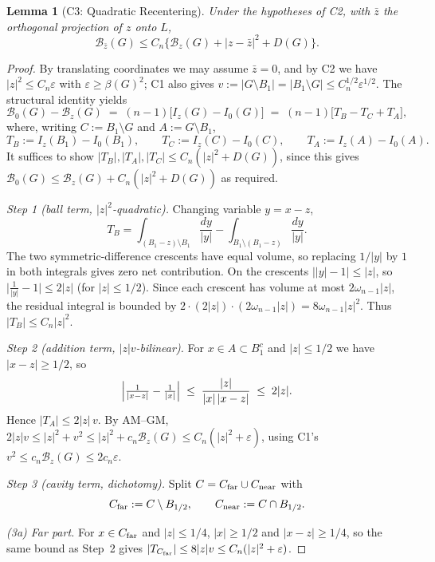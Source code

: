 \documentclass[11pt]{article}
\newtheorem{lemma}[theorem]{Lemma}
\newcommand{\B}{\mathcal{B}}
\newcommand{\eps}{\varepsilon}
\begin{document}
\begin{lemma}[C3: Quadratic Recentering] \label{lem:C3}
Under the hypotheses of C2, with $\bar z$ the orthogonal projection of $z$ onto $L$,
\[
  \B_{\bar z}(G) \le C_n \{ \B_z(G) + |z - \bar z|^2 + D(G) \}.
\]
\end{lemma}
\begin{proof}
By translating coordinates we may assume $\bar z = 0$, and by C2 we have $|z|^2 \le C_n \eps$ with $\eps \ge \beta(G)^2$; C1 also gives $v := |G \setminus B_1| = |B_1 \setminus G| \le C_n^{1/2}\eps^{1/2}$. The structural identity yields
\[
  \B_0(G) - \B_z(G) \;=\; (n-1)\bigl[I_z(G) - I_0(G)\bigr] \;=\; (n-1)\bigl[ T_B - T_C + T_A \bigr],
\]
where, writing $C := B_1 \setminus G$ and $A := G \setminus B_1$,
\[
  T_B := I_z(B_1) - I_0(B_1), \qquad T_C := I_z(C) - I_0(C), \qquad T_A := I_z(A) - I_0(A).
\]
It suffices to show $|T_B|, |T_A|, |T_C| \le C_n(|z|^2 + D(G))$, since this gives $\B_0(G) \le \B_z(G) + C_n(|z|^2 + D(G))$ as required.

\medskip
\emph{Step 1 (ball term, $|z|^2$-quadratic).} Changing variable $y = x-z$,
\[
  T_B = \int_{(B_1 - z)\setminus B_1}\frac{dy}{|y|} - \int_{B_1 \setminus (B_1 - z)}\frac{dy}{|y|}.
\]
The two symmetric-difference crescents have equal volume, so replacing $1/|y|$ by $1$ in both integrals gives zero net contribution. On the crescents $\bigl||y|-1\bigr| \le |z|$, so $\bigl|\tfrac{1}{|y|} - 1\bigr| \le 2|z|$ (for $|z| \le 1/2$). Since each crescent has volume at most $2\omega_{n-1}|z|$, the residual integral is bounded by $2 \cdot (2|z|)\cdot(2\omega_{n-1}|z|) = 8\omega_{n-1}|z|^2$. Thus $|T_B| \le C_n |z|^2$.

\medskip
\emph{Step 2 (addition term, $|z|v$-bilinear).} For $x \in A \subset B_1^c$ and $|z| \le 1/2$ we have $|x-z| \ge 1/2$, so
\[
  \Bigl|\tfrac{1}{|x-z|} - \tfrac{1}{|x|}\Bigr| \;\le\; \frac{|z|}{|x|\,|x-z|} \;\le\; 2|z|.
\]
Hence $|T_A| \le 2|z|\, v$. By AM--GM, $2|z|v \le |z|^2 + v^2 \le |z|^2 + c_n \B_z(G) \le C_n(|z|^2 + \eps)$, using C1's $v^2 \le c_n \B_z(G) \le 2c_n \eps$.

\medskip
\emph{Step 3 (cavity term, dichotomy).} Split $C = C_{\rm far} \cup C_{\rm near}$ with
\[
 C_{\rm far} := C \setminus B_{1/2}, \qquad C_{\rm near} := C \cap B_{1/2}.
\]

\emph{(3a) Far part.} For $x \in C_{\rm far}$ and $|z| \le 1/4$, $|x| \ge 1/2$ and $|x-z| \ge 1/4$, so the same bound as Step~2 gives $|T_{C_{\rm far}}| \le 8|z| v \le C_n(|z|^2 + \eps)$.


\end{proof}
\end{document}

